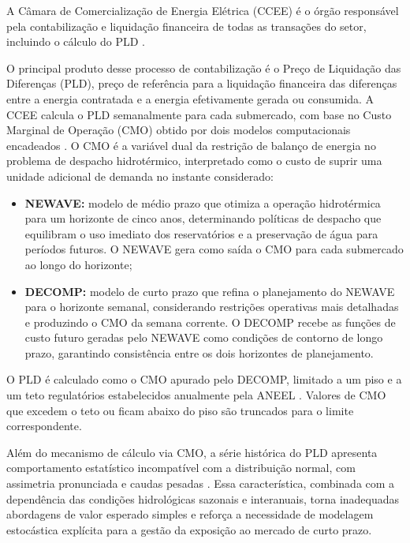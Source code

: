 A Câmara de Comercialização de Energia Elétrica (CCEE) é o órgão responsável pela contabilização e liquidação financeira de todas as transações do setor, incluindo o cálculo do PLD \cite{ccee2024a}.

O principal produto desse processo de contabilização é o Preço de Liquidação das Diferenças (PLD), preço de referência para a liquidação financeira das diferenças entre a energia contratada e a energia efetivamente gerada ou consumida. A CCEE calcula o PLD semanalmente para cada submercado, com base no Custo Marginal de Operação (CMO) obtido por dois modelos computacionais encadeados \cite{ccee2024a}. O CMO é a variável dual da restrição de balanço de energia no problema de despacho hidrotérmico, interpretado como o custo de suprir uma unidade adicional de demanda no instante considerado:

\begin{itemize}
  \item \textbf{NEWAVE:} modelo de médio prazo que otimiza a operação hidrotérmica para um horizonte de cinco anos, determinando políticas de despacho que equilibram o uso imediato dos reservatórios e a preservação de água para períodos futuros. O NEWAVE gera como saída o CMO para cada submercado ao longo do horizonte;
  \item \textbf{DECOMP:} modelo de curto prazo que refina o planejamento do NEWAVE para o horizonte semanal, considerando restrições operativas mais detalhadas e produzindo o CMO da semana corrente. O DECOMP recebe as fun\c{c}\~oes de custo futuro geradas pelo NEWAVE como condi\c{c}\~oes de contorno de longo prazo, garantindo consist\^encia entre os dois horizontes de planejamento.
\end{itemize}

O PLD é calculado como o CMO apurado pelo DECOMP, limitado a um piso e a um teto regulatórios estabelecidos anualmente pela ANEEL \cite{ccee2024a}. Valores de CMO que excedem o teto ou ficam abaixo do piso são truncados para o limite correspondente.

Além do mecanismo de cálculo via CMO, a série histórica do PLD apresenta comportamento estatístico incompatível com a distribuição normal, com assimetria pronunciada e caudas pesadas \cite{guerreiro2017}. Essa característica, combinada com a dependência das condições hidrológicas sazonais e interanuais, torna inadequadas abordagens de valor esperado simples e reforça a necessidade de modelagem estocástica explícita para a gestão da exposição ao mercado de curto prazo.

